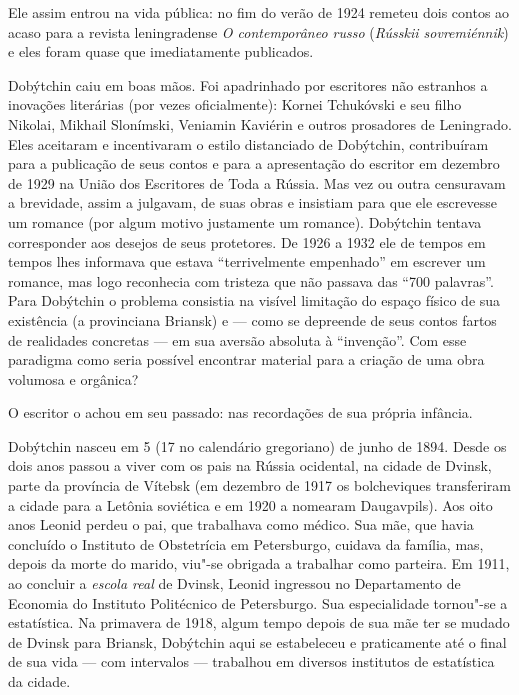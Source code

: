 Ele assim entrou na vida pública: no fim do verão de 1924 remeteu dois
contos ao acaso para a revista leningradense \emph{O contemporâneo
russo} (\emph{Rússkii sovremiénnik}) e eles foram quase que imediatamente publicados.

Dobýtchin caiu em boas mãos. Foi apadrinhado por escritores não
estranhos a inovações literárias (por vezes oficialmente): Kornei
Tchukóvski e seu filho Nikolai, Mikhail Slonímski, Veniamin Kaviérin e
outros prosadores de Leningrado. Eles aceitaram e incentivaram o estilo
distanciado de Dobýtchin, contribuíram para a publicação de seus contos
e para a apresentação do escritor em dezembro de 1929 na União dos
Escritores de Toda a Rússia. Mas vez ou outra censuravam a brevidade,
assim a julgavam, de suas obras e insistiam para que ele escrevesse um
romance (por algum motivo justamente um romance). Dobýtchin tentava
corresponder aos desejos de seus protetores. De 1926 a 1932 ele de
tempos em tempos lhes informava que estava ``terrivelmente empenhado''
em escrever um romance, mas logo reconhecia com tristeza que não passava
das ``700 palavras''. Para Dobýtchin o problema consistia na visível
limitação do espaço físico de sua existência (a provinciana Briansk) e
--- como se depreende de seus contos fartos de realidades concretas ---
em sua aversão absoluta à ``invenção''. Com esse paradigma como seria
possível encontrar material para a criação de uma obra volumosa e
orgânica?

O escritor o achou em seu passado: nas recordações de sua própria
infância.

Dobýtchin nasceu em 5 (17 no calendário gregoriano) de junho de 1894. Desde os dois anos passou a
viver com os pais na Rússia ocidental, na cidade de Dvinsk, parte da
província de Vítebsk (em dezembro de 1917 os bolcheviques transferiram a
cidade para a Letônia soviética e em 1920 a nomearam Daugavpils). Aos
oito anos Leonid perdeu o pai, que trabalhava como médico. Sua mãe, que
havia concluído o Instituto de Obstetrícia em Petersburgo, cuidava da
família, mas, depois da morte do marido, viu"-se obrigada a trabalhar
como parteira. Em 1911, ao concluir a \emph{escola real} de Dvinsk,
Leonid ingressou no Departamento de Economia do Instituto Politécnico de
Petersburgo. Sua especialidade tornou"-se a estatística. Na primavera de
1918, algum tempo depois de sua mãe ter se mudado de Dvinsk para
Briansk, Dobýtchin aqui se estabeleceu e praticamente até o final de sua
vida --- com intervalos --- trabalhou em diversos institutos de estatística
da cidade.

